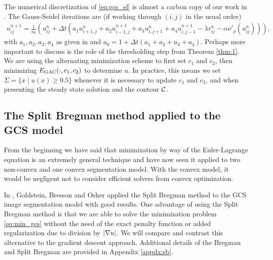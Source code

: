 The numerical discretization of \eqref{eq:gcs_el} is almost a carbon copy of our work in . The Gauss-Seidel iterations are (if working through $(i,j)$ in the usual order)
\begin{align*}
u^{n+1}_{ij} 
= \frac{1}{a_0} 
\left( u^n_{ij} + \Delta t 
\left( a_1 u^n_{i+1,j} + a_2 u^{n+1}_{i-1,j} + a_3 u^{n}_{i,j+1} + a_4 u^{n+1}_{i,j-1}
- \lambda r_{ij}^n
- \alpha \nu'_\rho( u^n_{ij} )
\right)
\right),
\end{align*}
with $a_1,a_2,a_3,a_4$ as given in  and $a_0 = 1 + \Delta t(a_1 + a_2 + a_3 + a_4)$. Perhaps more important to discuss is the role of the thresholding step from Theorem \ref{thm:1}. We are using the alternating minimization scheme to first set $c_1$ and $c_2$, then minimizing $E_\textrm{GAC}(\cdot, c_1, c_2)$ to determine $u$. In practice, this means we set $\Sigma = \{x \mid u(x) \geq 0.5\}$ whenever it is necessary to update $c_1$ and $c_2$, and when presenting the steady state solution and the contour $\mathcal{C}$.


\subsection{The Split Bregman method applied to the GCS model}
\label{subsect:sb}
From the beginning we have said that minimization by way of the Euler-Lagrange equation is an extremely general technique and have now seen it applied to two non-convex and one convex segmentation model. With the convex model, it would be negligent not to consider efficient solvers from convex optimization. 

In \cite{goldstein2010geometric}, Goldstein, Bresson and Osher applied the Split Bregman method \cite{goldstein2009split} to the GCS image segmentation model with good results. One advantage of using the Split Bregman method is that we are able to solve the minimization problem \eqref{eq:min_gcs} without the need of the exact penalty function  or added regularization due to division by $\lvert\nabla u\rvert$. We will compare and contrast this alternative to the gradient descent approach. Additional details of the Bregman and Split Bregman are provided in Appendix \ref{appdx:sb}.  


